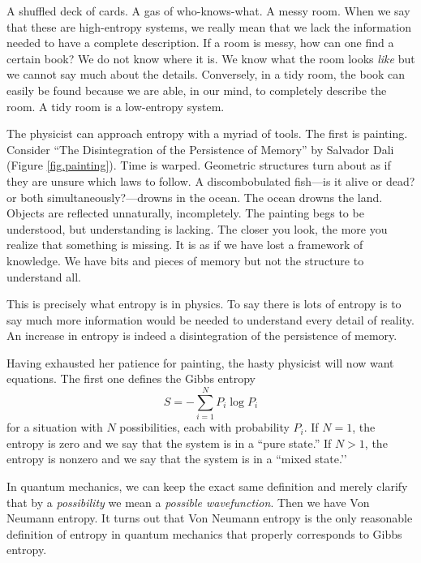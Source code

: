 
A shuffled deck of cards. A gas of who-knows-what. A messy room. When we say that these are high-entropy systems, we really mean that we lack the information needed to have a complete description. If a room is messy, how can one find a certain book? We do not know where it is. We know what the room looks \emph{like} but we cannot say much about the details. Conversely, in a tidy room, the book can easily be found because we are able, in our mind, to completely describe the room. A tidy room is a low-entropy system.

The physicist can approach entropy with a myriad of tools. The first is painting. Consider “The Disintegration of the Persistence of Memory” by Salvador Dali (Figure \ref{fig.painting}). Time is warped. Geometric structures turn about as if they are unsure which laws to follow. A discombobulated fish—is it alive or dead? or both simultaneously?—drowns in the ocean. The ocean drowns the land. Objects are reflected unnaturally, incompletely. The painting begs to be understood, but understanding is lacking. The closer you look, the more you realize that something is missing. It is as if we have lost a framework of knowledge. We have bits and pieces of memory but not the structure to understand all.

This is precisely what entropy is in physics. To say there is lots of entropy is to say much more information would be needed to understand every detail of reality. An increase in entropy is indeed a disintegration of the persistence of memory.

Having exhausted her patience for painting, the hasty physicist will now want equations. The first one defines the Gibbs entropy
\[
S = -\sum_{i=1}^N P_i \log P_i
\]
for a situation with \(N\) possibilities, each with probability \(P_i\). If \(N=1\), the entropy is zero and we say that the system is in a ``pure state.''  If \(N > 1\), the entropy is nonzero and we say that the system is in a ``mixed state.’’

In quantum mechanics, we can keep the exact same definition and merely clarify that by a \emph{possibility} we mean a \emph{possible wavefunction}. Then we have Von Neumann entropy. It turns out that Von Neumann entropy is the only reasonable definition of entropy in quantum mechanics that properly corresponds to Gibbs entropy. \cite{heusler,bracken,donald}

